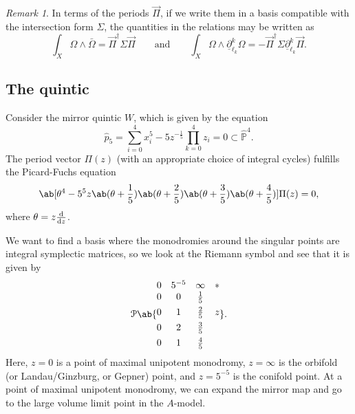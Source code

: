 \documentclass[10pt,oldfontcommands,oneside]{memoir}
\theoremstyle{definition}
\theoremstyle{remark}
\newtheorem{rmk}[thm]{Remark}
\theoremstyle{plain}
\theoremstyle{definition}
\theoremstyle{remark}
\renewcommand{\P}{\mathbb{P}}
\newcommand{\mc}[1]{\mathcal{#1}}
\newcommand{\ul}[1]{\underline{#1}}
\newcommand{\1}{\mathbf{1}}
\newcommand{\2}{\mathbf{2}}
\newcommand{\3}{\mathbf{3}}
\begin{document}
\begin{rmk}
    In terms of the periods $\vec{\Pi}$, if we write them in a basis compatible with the intersection form $\Sigma$, the quantities in the relations may be written as
    \[ \int_X \Omega \wedge \bar{\Omega} = \vec{\Pi}^{\dag} \Sigma \vec{\Pi} \qquad \text{and} \qquad \int_X \Omega \wedge \ul{\partial}_{\ell_k}^k \Omega = - \vec{\Pi}^{\dag}\Sigma \ul{\partial}_{\ell_k}^k \vec{\Pi}. \]
\end{rmk}

\subsection{The quintic}%
\label{sub:The quintic}

Consider the mirror quintic $W$, which is given by the equation
\[ \hat{p}_5 = \sum_{i=0}^4 x_i^5 - 5 z^{-\frac{1}{5}} \prod_{k=0}^4 z_i = 0 \subset \hat{\P}^4. \]
The period vector $\Pi(z)$ (with an appropriate choice of integral cycles) fulfills the Picard-Fuchs equation
\[ \ab[\theta^4 - 5^5z \ab(\theta + \frac{1}{5})\ab(\theta + \frac{2}{5})\ab(\theta + \frac{3}{5})\ab(\theta + \frac{4}{5})] \Pi(z) = 0, \]
where $\theta = z \odv{}{z}$.

We want to find a basis where the monodromies around the singular points are integral symplectic matrices, so we look at the Riemann symbol and see that it is given by
\[ \mc{P}\ab\{ \begin{matrix}
    0 & 5^{-5} & \infty & * \\
    0 & 0 & \frac{1}{5} \\
    \\[-0.8em]
    0 & 1 & \frac{2}{5} & z \\
    \\[-0.8em]
    0 & 2 & \frac{3}{5} \\
    \\[-0.8em]
    0 & 1 & \frac{4}{5}
\end{matrix}
\}.\]
Here, $z=0$ is a point of maximal unipotent monodromy, $z=\infty$ is the orbifold (or Landau/Ginzburg, or Gepner) point, and $z=5^{-5}$ is the conifold point. At a point of maximal unipotent monodromy, we can expand the mirror map and go to the large volume limit point in the $A$-model.
\end{document}
